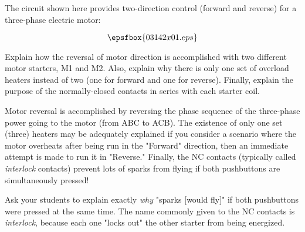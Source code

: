 

The circuit shown here provides two-direction control (forward and reverse) for a three-phase electric motor:

$$\epsfbox{03142x01.eps}$$

Explain how the reversal of motor direction is accomplished with two different motor starters, M1 and M2.  Also, explain why there is only one set of overload heaters instead of two (one for forward and one for reverse).  Finally, explain the purpose of the normally-closed contacts in series with each starter coil.







Motor reversal is accomplished by reversing the phase sequence of the three-phase power going to the motor (from ABC to ACB).  The existence of only one set (three) heaters may be adequately explained if you consider a scenario where the motor overheats after being run in the "Forward" direction, then an immediate attempt is made to run it in "Reverse."  Finally, the NC contacts (typically called {\it interlock} contacts) prevent lots of sparks from flying if both pushbuttons are simultaneously pressed!







Ask your students to explain exactly {\it why} "sparks [would fly]" if both pushbuttons were pressed at the same time.  The name commonly given to the NC contacts is {\it interlock}, because each one "locks out" the other starter from being energized.




